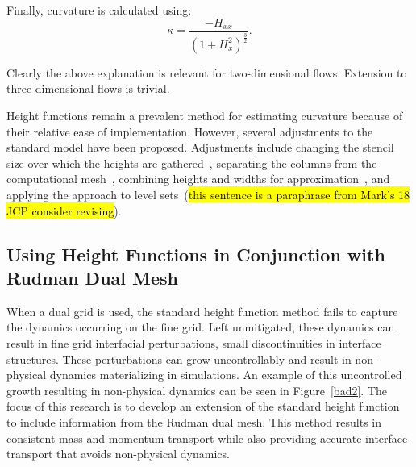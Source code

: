 \noindent Finally, curvature is calculated using:
\begin{equation}
\kappa = \frac{-H_{xx}}{(1+H_{x}^{2})^{\frac{3}{2}}}.
\label{eqn:kap}
\end{equation}

\noindent Clearly the above explanation is relevant for two-dimensional flows. Extension to three-dimensional flows is trivial. 

Height functions remain a prevalent method for estimating curvature because of their relative ease of implementation. However, several adjustments to the standard model have been proposed. Adjustments include changing the stencil size over which the heights are gathered~\cite{1}, separating the columns from the computational mesh~\cite{2}, combining heights and widths for approximation~\cite{2}, and applying the approach to level sets~\cite{2}(\hl{this sentence is a paraphrase from Mark's 18 JCP consider revising}).


\subsection{Using Height Functions in Conjunction with Rudman Dual Mesh }

When a dual grid is used, the standard height function method fails to capture the dynamics occurring on the fine grid. Left unmitigated, these dynamics can result in fine grid interfacial perturbations, small discontinuities in interface structures. These perturbations can grow uncontrollably and result in non-physical dynamics materializing in simulations. An example of this uncontrolled growth resulting in non-physical dynamics can be seen in Figure~\ref{bad2}. The focus of this research is to develop an extension of the standard height function to include information from the Rudman dual mesh. This method results in consistent mass and momentum transport while also providing accurate interface transport that avoids non-physical dynamics.


